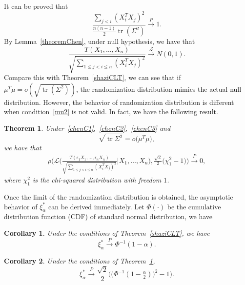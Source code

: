 \documentclass[review]{elsarticle}
\DeclareMathOperator{\mytr}{tr}
\theoremstyle{plain}
\newtheorem{theorem}{\quad\quad Theorem}
\newtheorem{corollary}{\quad\quad Corollary}
\theoremstyle{definition}
\theoremstyle{remark}
\begin{document}
It can be proved that 
\begin{equation*}
\frac{\sum_{j<i}(X_i^T X_j)^2}{\frac{n(n-1)}{2}\mytr (\Sigma^2)}\xrightarrow{P}1.
\end{equation*}
By Lemma~\ref{theoremChen},  under null hypothesis, we have that
\begin{equation*}
\frac{T(X_1,\ldots, X_n)}{\sqrt{\sum_{1\leq j<i\leq n}{(X_i^T X_j)}^2}}\xrightarrow{\mathcal{L}}N(0,1).
\end{equation*}
Compare this with Theorem~\ref{shaziCLT}, we can see that if $\mu^T \mu=o(\sqrt{\mytr (\Sigma^2)})$,  the randomization distribution mimics the actual null distribution.
However, the behavior of randomization distribution is different when condition~\eqref{mu2} is not valid.
In fact, we have the following result.
\begin{theorem}\label{farT}
    Under~\eqref{chenC1},~\eqref{chenC2},~\eqref{chenC3} and
    \begin{equation}\label{mu3}
       \sqrt{\mytr {\Sigma}^2} =o\big(\mu^T\mu\big),
    \end{equation}
    we have that
    \begin{equation*}
        \begin{aligned}
            \rho\bigg(\mathcal{L}\bigg(\frac{T(\epsilon_1 X_1,\ldots,\epsilon_n X_n)}{\sqrt{\sum_{1\leq j<i\leq n}{(X_i^T X_j)}^2}}\bigg|X_1,\ldots,X_n\bigg),\frac{\sqrt{2}}{2}\big(\chi^2_1-1\big)\bigg)
            \xrightarrow{P} 0,
        \end{aligned}
    \end{equation*}
            where $\chi^2_1$ is the chi-squared distribution with freedom $1$.
\end{theorem}

Once the limit of the randomization distribution is obtained, the asymptotic behavior of $\xi_{\alpha}^*$ can be derived immediately.
Let $\Phi(\cdot)$ be the cumulative distribution function (CDF) of standard normal distribution, we have
\begin{corollary}\label{corollaryQuan}
    Under the conditions of Theorem~\ref{shaziCLT}, we have
    \begin{equation*}
    \xi_{\alpha}^*\xrightarrow{P} \Phi^{-1}(1-\alpha).
    \end{equation*}
\end{corollary}

\begin{corollary}\label{corollaryQuan2}
    Under the conditions of Theorem~\ref{farT},
    \begin{equation*}
    \xi_{\alpha}^*\xrightarrow{P}\frac{\sqrt{2}}{2}\Big(\big(\Phi^{-1}(1-\tfrac{\alpha}{2})\big)^2-1\Big).
    \end{equation*}
\end{corollary}
\end{document}

